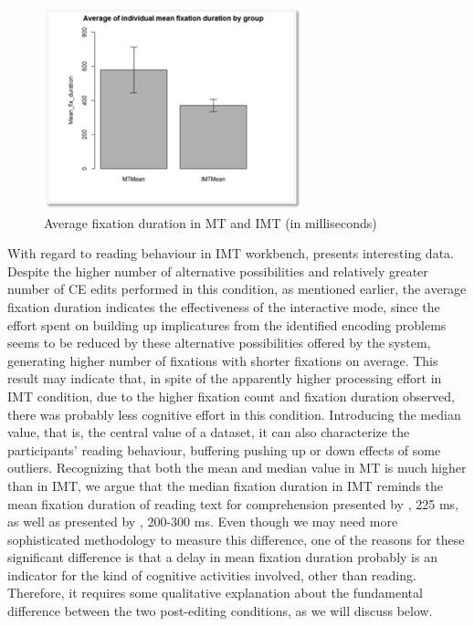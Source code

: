 \documentclass[output=paper]{langsci/langscibook}
\begin{document}
\begin{figure}
 \includegraphics[width=\textwidth]{figures/Sarto7.png}
 \caption{Average fixation duration in MT and IMT (in milliseconds)}
 \label{sarto:fig:7}
\end{figure} 


With regard to reading behaviour in IMT workbench,  presents interesting data. Despite the higher number of alternative possibilities and relatively greater number of CE edits performed in this condition, as mentioned earlier, the average fixation duration indicates the effectiveness of the interactive mode, since the effort spent on building up implicatures from the identified encoding problems seems to be reduced by these alternative possibilities offered by the system, generating higher number of fixations with shorter fixations on average. This result may indicate that, in spite of the apparently higher processing effort in IMT condition, due to the higher fixation count and fixation duration observed, there was probably less cognitive effort in this condition. Introducing the median value, that is, the central value of a dataset, it can also characterize the participants’ reading behaviour, buffering pushing up or down effects of some outliers. Recognizing that both the mean and median value in MT is much higher than in IMT, we argue that the median fixation duration in IMT reminds the mean fixation duration of reading text for comprehension presented by \citet{Just1980}, 225 ms, as well as presented by \citet{rayner1998}, 200-300 ms. Even though we may need more sophisticated methodology to measure this difference, one of the reasons for these significant difference is that a delay in mean fixation duration probably is an indicator for the kind of cognitive activities involved, other than reading. Therefore, it requires some qualitative explanation about the fundamental difference between the two post-editing conditions, as we will discuss below. 
\end{document}
